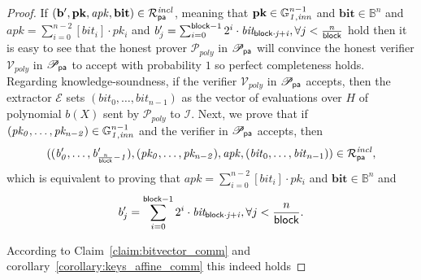 \begin{proof} 
If $(\mathbf{b'}, \mathbf{pk}, \mathit{apk}, \mathbf{bit}) \in \mathcal{R}^{\mathit{incl}}_{\mathsf{pa}}$, meaning that 
$\mathbf{pk} \in \mathbb{G}_{\mathit{1,inn}}^{n-1}$ and $\mathbf{bit} \in \mathbb{B}^n$ and $\mathit{apk} = \sum_{i=0}^{n-2} [\mathit{bit_i}] \cdot \mathit{pk_i}$ and 
 $b'_{j} = \sum_{i=0}^{\mathsf{block} -1}2^i \cdot \mathit{bit_{\mathsf{block} \cdot j + i}}, \forall j < \frac{n}{\mathsf{block}}$ 
hold then it is easy to see that the honest prover $\mathcal{P}_{poly}$ in $\mathscr{P}_{\mathsf{pa}}$ will convince the honest 
verifier $\mathcal{V}_{poly}$ in $\mathscr{P}_{\mathsf{pa}}$ to accept with probability $1$ so perfect completeness holds. Regarding knowledge-soundness, if the verifier $\mathcal{V}_{poly}$ in $\mathscr{P}_{\mathsf{pa}}$ accepts, 
then the extractor $\mathcal{E}$ sets $(\mathit{bit}_0, \ldots, \mathit{bit}_{n-1})$ as the vector of evaluations over $H$ of polynomial $b(X)$ sent by $\mathcal{P}_{poly}$ 
to $\mathcal{I}$. Next, we prove that if $(\mathit{pk_0}, \ldots, \mathit{pk_{n-2}}) \in \mathbb{G}_{\mathit{1,inn}}^{n-1}$ and the verifier in $\mathscr{P}_{\mathsf{pa}}$ accepts, 
then $$((\mathit{b'_{0}}, \ldots, \mathit{b'_{\frac{n}{\mathsf{block}}-1}}), (\mathit{pk_0}, \ldots, \mathit{pk_{n-2}}), \mathit{apk}, (\mathit{bit}_0, \ldots, \mathit{bit}_{n-1})) \in \mathcal{R}^{\mathit{incl}}_{\mathsf{pa}},$$ 
which is equivalent to proving that  $\mathit{apk} = \sum_{i=0}^{n-2} [\mathit{bit_i}] \cdot \mathit{pk_i}$ and 
 $\mathbf{bit} \in \mathbb{B}^n$ and  $$b'_{j} = \sum_{i=0}^{\mathsf{block} -1}2^i \cdot \mathit{bit_{\mathsf{block} \cdot j + i}}, \forall j < \frac{n}{\mathsf{block}}.$$

According to Claim~\ref{claim:bitvector_comm} and corollary~\ref{corollary:keys_affine_comm} this indeed holds \ewnp
\end{proof}

